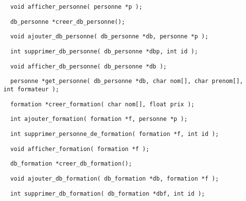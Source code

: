 \documentclass[11pt]{article}
\begin{document}
\begin{lstlisting}
  void afficher_personne( personne *p );
\end{lstlisting}

\begin{lstlisting}
  db_personne *creer_db_personne();
\end{lstlisting}

\begin{lstlisting}
  void ajouter_db_personne( db_personne *db, personne *p );
\end{lstlisting}

\begin{lstlisting}
  int supprimer_db_personne( db_personne *dbp, int id );
\end{lstlisting}

\begin{lstlisting}
  void afficher_db_personne( db_personne *db );
\end{lstlisting}

\begin{lstlisting}
  personne *get_personne( db_personne *db, char nom[], char prenom[], int formateur );
\end{lstlisting}

\begin{lstlisting}
  formation *creer_formation( char nom[], float prix );
\end{lstlisting}

\begin{lstlisting}
  int ajouter_formation( formation *f, personne *p );
\end{lstlisting}

\begin{lstlisting}
  int supprimer_personne_de_formation( formation *f, int id );
\end{lstlisting}

\begin{lstlisting}
  void afficher_formation( formation *f );
\end{lstlisting}

\begin{lstlisting}
  db_formation *creer_db_formation();
\end{lstlisting}

\begin{lstlisting}
  void ajouter_db_formation( db_formation *db, formation *f );
\end{lstlisting}

\begin{lstlisting}
  int supprimer_db_formation( db_formation *dbf, int id );
\end{lstlisting}
\end{document}
